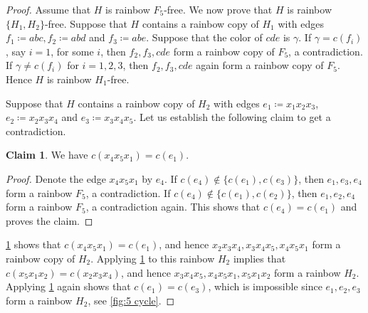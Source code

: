 \documentclass[10pt,a4paper]{article}
\theoremstyle{definition}
\newtheorem{claim}[theorem]{Claim}
\begin{document}
\begin{proof}
    Assume that $H$ is rainbow $F_5$-free.
    We now prove that $H$ is rainbow $\{H_1,H_2\}$-free.
    Suppose that $H$ contains a rainbow copy of $H_1$ with edges $f_1\coloneqq abc,f_2\coloneqq abd$ and $f_3\coloneqq abe$.
    Suppose that the color of $cde$ is $\gamma$.
    If $\gamma=c(f_i)$, say $i=1$, for some $i$, then $f_2,f_3,cde$ form a rainbow copy of $F_5$, a contradiction.
    If $\gamma\ne c(f_i)$ for $i=1,2,3$, then $f_2,f_3,cde$ again form a rainbow copy of $F_5$.
    Hence $H$ is rainbow $H_1$-free.

    Suppose that $H$ contains a rainbow copy of $H_2$ with edges $e_1 \coloneqq x_1x_2x_3$, $e_2\coloneqq x_2x_3x_4$ and $e_3\coloneqq  x_3x_4x_5$.
    Let us establish the following claim to get a contradiction.
    \begin{claim}\label{clm:5 cycle}
        We have $c(x_4x_5x_1)=c(e_1)$.
    \end{claim}
    \begin{proof}
        Denote the edge $x_4x_5x_1$ by $e_4$.
        If $c(e_4)\notin\{c(e_1),c(e_3)\}$, then $e_1,e_3,e_4$ form a rainbow $F_5$, a contradiction.
        If $c(e_4)\notin\{c(e_1),c(e_2)\}$, then $e_1,e_2,e_4$ form a rainbow $F_5$, a contradiction again.
        This shows that $c(e_4)=c(e_1)$ and proves the claim.
    \end{proof}
    \cref{clm:5 cycle} shows that $c(x_4x_5x_1)=c(e_1)$, and hence $x_2x_3x_4,x_3x_4x_5,x_4x_5x_1$ form a rainbow copy of $H_2$.
    Applying \cref{clm:5 cycle} to this rainbow $H_2$ implies that $c(x_5x_1x_2)=c(x_2x_3x_4)$, and hence $x_3x_4x_5,x_4x_5x_1,x_5x_1x_2$ form a rainbow $H_2$.
    Applying \cref{clm:5 cycle} again shows that $c(e_1)=c(e_3)$, which is impossible since $e_1,e_2,e_3$ form a rainbow $H_2$, see \cref{fig:5 cycle}.
\end{proof}
\end{document}
